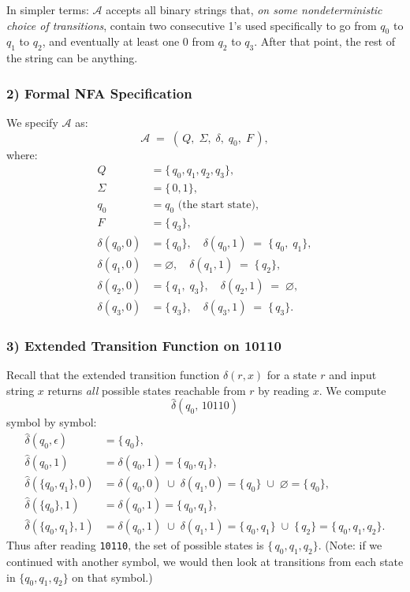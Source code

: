\documentclass{article}
\theoremstyle{theorem}
\theoremstyle{definition}
\theoremstyle{remark}
\begin{document}
In simpler terms: $\mathcal{A}$ accepts all binary strings that, \emph{on some nondeterministic choice of transitions}, contain two consecutive 1's used specifically to go from $q_0$ to $q_1$ to $q_2$, and eventually at least one 0 from $q_2$ to $q_3$.  After that point, the rest of the string can be anything.  

\subsubsection*{2) Formal NFA Specification }
We specify $\mathcal{A}$ as:
\[
\mathcal{A} \;=\; (\,Q,\;\Sigma,\;\delta,\;q_0,\;F\,),
\]
where:
\[
\begin{aligned}
Q &= \{\,q_0,q_1,q_2,q_3\},\\
\Sigma &= \{\,0,1\},\\
q_0 &= q_0 \text{ (the start state)},\\
F &= \{\,q_3\},\\
\delta(q_0,0) &= \{\,q_0\},\quad \delta(q_0,1) \;=\; \{\,q_0,\;q_1\},\\
\delta(q_1,0) &= \varnothing,\quad \delta(q_1,1) \;=\; \{\,q_2\},\\
\delta(q_2,0) &= \{\,q_1,\;q_3\},\quad \delta(q_2,1) \;=\; \varnothing,\\
\delta(q_3,0) &= \{\,q_3\},\quad \delta(q_3,1) \;=\; \{\,q_3\}.
\end{aligned}
\]

\newpage

\subsubsection*{3) Extended Transition Function on 10110}
Recall that the extended transition function $\hat{\delta}(r,x)$ for a state $r$ and input string $x$ returns \emph{all} possible states reachable from $r$ by reading $x$.  We compute 
\[
\hat{\delta}(q_0,\,10110)
\]
symbol by symbol:
\[
\begin{aligned}
\hat{\delta}(q_0,\epsilon) &= \{\,q_0\},\\
\hat{\delta}(q_0,1) &= \delta(q_0,1) = \{\,q_0,q_1\},\\
\hat{\delta}(\{q_0,q_1\},0) 
  &= \delta(q_0,0)\;\cup\;\delta(q_1,0) 
  = \{\,q_0\}\;\cup\;\varnothing 
  = \{\,q_0\},\\
\hat{\delta}(\{q_0\},1)
  &= \delta(q_0,1) 
  = \{\,q_0,q_1\},\\
\hat{\delta}(\{q_0,q_1\},1)
  &= \delta(q_0,1) \;\cup\;\delta(q_1,1) 
  = \{\,q_0,q_1\}\;\cup\;\{\,q_2\} 
  = \{\,q_0,q_1,q_2\}.
\end{aligned}
\]
Thus after reading \texttt{10110}, the set of possible states is $\{\,q_0,q_1,q_2\}$.  
(Note: if we continued with another symbol, we would then look at transitions from each state in $\{q_0,q_1,q_2\}$ on that symbol.)
\end{document}
